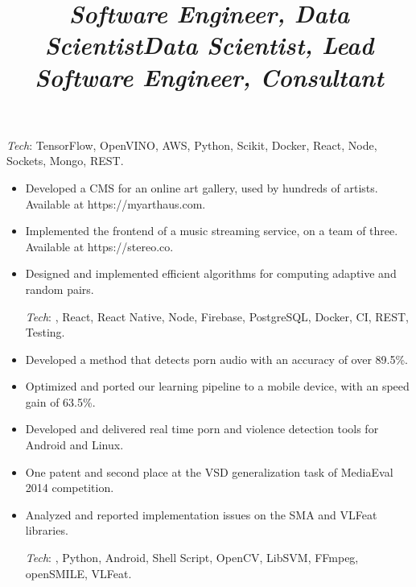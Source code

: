 \begin{resume}
\begin{position}
\begin{itemize}
\vspace{1mm}
{\small \emph{Tech}: TensorFlow, OpenVINO, AWS, Python, Scikit, Docker, React, Node, Sockets, Mongo, REST.}
\end{itemize}
\end{position}

\title{\emph{Software Engineer, Data Scientist}}
\begin{position}
\vspace{1mm}
\begin{itemize}\small
\item Developed a CMS for an online art gallery, used by hundreds of artists. Available at https://myarthaus.com.
\item Implemented the frontend of a music streaming service, on a team of three. Available at https://stereo.co.
\item Designed and implemented efficient algorithms for computing adaptive and random pairs.

\vspace{1mm}
{\small \emph{Tech}: \Cplusplus, React, React Native, Node, Firebase, PostgreSQL, Docker, CI, REST, Testing.}
\end{itemize}
\end{position}

\title{\emph{Data Scientist, Lead Software Engineer, Consultant}}
\begin{position}
\vspace{1mm}
\begin{itemize}\small
\item Developed a method that detects porn audio with an accuracy of over 89.5\%.
\item Optimized and ported our learning pipeline to a mobile device, with
an speed gain of 63.5\%.
\item Developed and delivered real time porn and violence detection tools for Android and Linux.
\item One patent and second place at the VSD generalization task of MediaEval 2014 competition.
\item Analyzed and reported implementation issues on the SMA and VLFeat libraries.

\vspace{1mm}
{\small \emph{Tech}: \Cplusplus, Python, Android, Shell Script, OpenCV, LibSVM,
FFmpeg, openSMILE, VLFeat\@.}
\end{itemize}
\end{position}


\end{resume}

